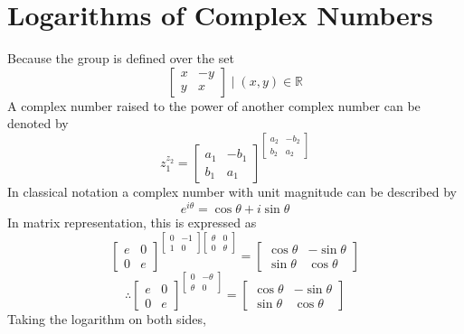 \documentclass[12pt]{article}
\begin{document}
    \section{Logarithms of Complex Numbers}
    Because the group is defined over the set
    $$\begin{bmatrix}
        x & -y \\
        y & x 
    \end{bmatrix} \mid (x,y) \in \mathbb{R} $$
    A complex number raised to the power of another complex number can be denoted by
    $$ z_{1}^{z_{2}} = {\begin{bmatrix} a_{1} & -b_{1} \\ b_{1} & a_{1}   \end{bmatrix}}^{\begin{bmatrix} a_{2} & -b_{2} \\ b_{2} & a_{2}   \end{bmatrix}}$$
    In classical notation a complex number with unit magnitude can be described by
    $$ e^{i\theta} = \cos{\theta} + i\sin{\theta}$$
    In matrix representation, this is expressed as
    $$ {\begin{bmatrix}
        e & 0 \\
        0 & e 
    \end{bmatrix}}^{\begin{bmatrix}
        0 & -1 \\
        1 & 0 
    \end{bmatrix}\begin{bmatrix}
        \theta & 0 \\
        0 & \theta 
    \end{bmatrix}} = \begin{bmatrix}
        \cos{\theta} & {-\sin{\theta}} \\
        \sin{\theta} & \cos{\theta} 
    \end{bmatrix} $$
    $$\therefore {\begin{bmatrix}
        e & 0 \\
        0 & e 
    \end{bmatrix}}^{\begin{bmatrix}
        0 & -\theta \\
        \theta & 0 
    \end{bmatrix}} = \begin{bmatrix}
        \cos{\theta} & {-\sin{\theta}} \\
        \sin{\theta} & \cos{\theta} 
    \end{bmatrix} $$
    Taking the logarithm on both sides,
\end{document}

